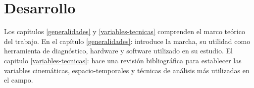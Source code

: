 \section{Desarrollo}


Los capítulos \ref{generalidades} y \ref{variables-tecnicas} comprenden el marco teórico del trabajo. En el capítulo \ref{generalidades}:  introduce la marcha, su utilidad como herramienta de diagnóstico, hardware y software utilizado en su estudio. El capitulo \ref{variables-tecnicas}:  hace una revisión bibliográfica para establecer las variables cinemáticas, espacio-temporales y técnicas de análisis más utilizadas en el campo. 
